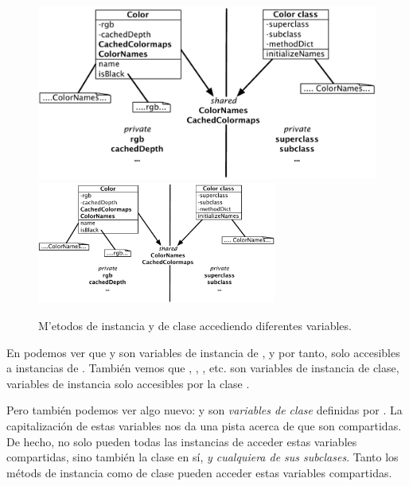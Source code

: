 \documentclass[a4paper,10pt,twoside]{book}
\begin{document}
\begin{figure}[htb]
\begin{center}
\ifluluelse
	{\includegraphics[width=\textwidth]{privateSharedVarColor}}
	{\includegraphics[width=0.7\textwidth]{privateSharedVarColor}}
\caption{M'etodos de instancia y de clase accediendo diferentes variables.}
\end{center}
\end{figure}

En  podemos ver que  y  son variables de instancia de , y por tanto, solo accesibles a instancias de . Tambi\'en vemos que , , , etc. son variables de instancia de clase, \ie variables de instancia solo accesibles por la clase .

Pero tambi\'en podemos ver algo nuevo:  y  son \emph{variables de clase} definidas por .
La capitalizaci\'on de estas variables nos da una pista acerca de que son compartidas. De hecho, no solo pueden todas las instancias de  acceder estas variables compartidas, sino tambi\'en la clase  en s\'i, \emph{y cualquiera de sus subclases}.
Tanto los m\'etods de instancia como de clase pueden acceder estas variables compartidas.

\end{document}
